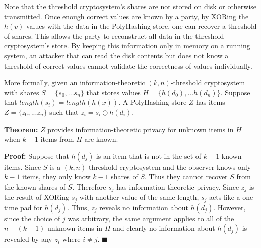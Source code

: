 Note that the threshold cryptosystem's shares are not stored on disk or 
otherwise transmitted.   Once enough correct values are known by a party, by 
XORing the $h(v)$ values with the data in the PolyHashing store, one can 
recover a threshold of shares.   This allows the party to reconstruct all
data in the threshold cryptosystem's store.   By keeping this information
only in memory on a running system, an attacker that can read the disk 
contents but does not know a threshold of correct values cannot validate
the correctness of values individually.

More formally, given an information-theoretic $(k,n)$-threshold cryptosystem 
with shares $S=\{s_0, ... s_n\}$ that stores values $H=\{h(d_0), ... h(d_n)\}$.
Suppose that $length(s_i) = length(h(x))$. A PolyHashing 
store $Z$ has items $Z=\{z_0, ...z_n\}$ such that $z_i= s_i \oplus h(d_i)$.   

{\bf Theorem:} $Z$ provides information-theoretic 
privacy for unknown items in $H$ when $k-1$ items from $H$ are known.


{\bf Proof:}
Suppose that $h(d_j)$ is an item that is not in the set of $k-1$ known items.
Since $S$ is a $(k,n)$-threshold cryptosystem and the observer knows only 
$k-1$ items, they only know $k-1$ shares of $S$.   Thus they cannot recover 
$S$ from the known shares of $S$.   Therefore $s_j$ has information-theoretic 
privacy.   Since $z_j$ is 
the result of XORing $s_j$ with another value of the same length, $s_j$ acts 
like a one-time pad for $h(d_j)$.   Thus, $z_j$ reveals no information
about $h(d_j)$.   However, since the choice of $j$ was 
arbitrary, the same argument applies to all of the $n-(k-1)$ unknown items in 
$H$ and clearly no information about $h(d_j)$ is revealed by any $z_i$ where
$i \neq j$.  
$\blacksquare$



